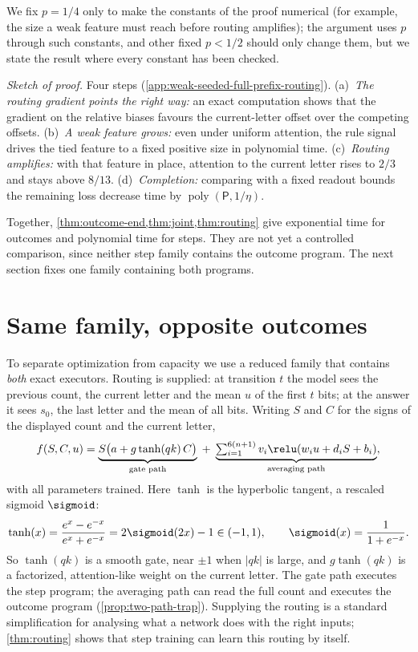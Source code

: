 We fix $p=1/4$ only to make the constants of the proof numerical (for example, the size a weak
feature must reach before routing amplifies); the argument uses $p$ through such constants, and other fixed
$p<1/2$ should only change them, but we state the result where every constant has been checked.

\emph{Sketch of proof.} Four steps (\cref{app:weak-seeded-full-prefix-routing}).
(a)~\emph{The routing gradient points the right way:} an exact computation shows that the gradient on the
relative biases favours the current-letter offset over the competing offsets.
(b)~\emph{A weak feature grows:} even under uniform attention, the rule signal drives the tied feature to a
fixed positive size in polynomial time.
(c)~\emph{Routing amplifies:} with that feature in place, attention to the current letter rises to $2/3$ and
stays above $8/13$.
(d)~\emph{Completion:} comparing with a fixed readout bounds the remaining loss decrease time by $\operatorname{poly}(\mathsf P,1/\eta)$.

Together, \cref{thm:outcome-end,thm:joint,thm:routing} give exponential time for outcomes and polynomial time
for steps. They are not yet a controlled comparison, since neither step family contains the outcome
program. The next section fixes one family containing both programs.

\section{Same family, opposite outcomes}
\label{sec:matched}
\label{sec:two-path-trap}

To separate optimization from capacity we use a reduced family that contains \emph{both} exact
executors. Routing is supplied: at transition $t$ the model sees the previous count, the current letter
and the mean $u$ of the first $t$ bits; at the answer it sees $s_0$, the last letter and the mean of all
bits. Writing $S$ and $C$ for the signs of the displayed count and the current letter,
\begin{equation}
 f(S,C,u)=\underbrace{S\bigl(a+g\tanh(qk)\,C\bigr)}_{\text{gate path}}
 \;+\;\underbrace{\textstyle\sum_{i=1}^{6(n+1)}v_i\relu(w_i u+d_iS+b_i)}_{\text{averaging path}},
 \label{eq:two-path-model}
\end{equation}
with all parameters trained. Here $\tanh$ is the hyperbolic tangent, a rescaled sigmoid $\sigmoid$:
\[
 \tanh(x)=\frac{e^{x}-e^{-x}}{e^{x}+e^{-x}}=2\sigmoid(2x)-1\in(-1,1),\qquad \sigmoid(x)=\frac1{1+e^{-x}} .
\]
So $\tanh(qk)$ is a smooth gate, near $\pm1$ when $|qk|$ is large, and $g\tanh(qk)$ is a factorized,
attention-like weight on the current letter. The gate path executes the step program; the averaging path can read the
full count and executes the outcome program (\cref{prop:two-path-trap}). Supplying the routing is a
standard simplification for analysing what a network does with the right inputs; \cref{thm:routing}
shows that step training can learn this routing by itself.

